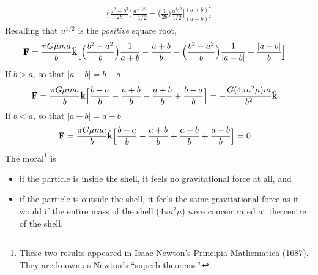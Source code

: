 \begin{eg}
\begin{align*}
      \Big(\frac{a^2-b^2}{2b}\Big)\frac{u^{-1/2}}{-1/2}
            -\Big(\frac{1}{2b}\Big)\frac{u^{1/2}}{1/2}
   \Big]_{(a-b)^2}^{(a+b)^2}
\end{align*}
Recalling that $u^{1/2}$ is the \emph{positive} square root,
\begin{align*}
\mathbf{F}&=\frac{\pi G\mu m a}{b} \hat{\mathbf{k}}\Big[ 
      \Big(\frac{b^2-a^2}{b}\Big)\frac{1}{a+b}
            -\frac{a+b}{b}
            -\Big(\frac{b^2-a^2}{b}\Big)\frac{1}{|a-b|}
            +\frac{|a-b|}{b}
   \Big]
\end{align*}
If $b>a$, so that $|a-b|=b-a$
\begin{align*}
\mathbf{F}&=\frac{\pi G\mu m a}{b} \hat{\mathbf{k}}\Big[ 
       \frac{b-a}{b}
            -\frac{a+b}{b}
            -\frac{a+b}{b}
            +\frac{b-a}{b}
   \Big]
=-\frac{G(4\pi a^2\mu)m}{b^2} \hat{\mathbf{k}}
\end{align*}
If $b<a$, so that $|a-b|=a-b$
\begin{align*}
\mathbf{F}&=\frac{\pi G\mu m a}{b} \hat{\mathbf{k}}\Big[ 
      \frac{b-a}{b}
            -\frac{a+b}{b}
            +\frac{a+b}{b}
            +\frac{a-b}{b}
   \Big]
=0
\end{align*}
The moral\footnote{These two results appeared in Isaac Newton's
Principia Mathematica (1687). They are known as Newton's ``superb 
theorems''.} is
\begin{itemize}
\item[$\circ$] 
if the particle is inside the shell, it feels no gravitational force at all,
and
\item[$\circ$]
if the particle is outside the shell, it feels the same gravitational force
as it would if the entire mass of the shell ($4\pi a^2\mu$) were
concentrated at the centre of the shell.
\end{itemize}
\end{eg}

